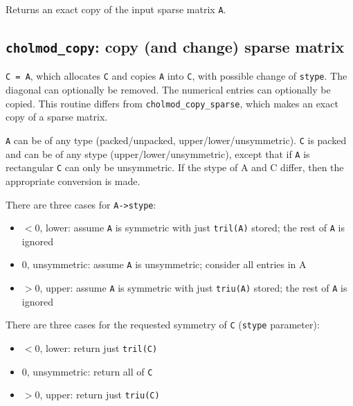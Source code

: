 \documentclass[11pt]{article}
\begin{document}

Returns an exact copy of the input sparse matrix {\tt A}.

\subsection{{\tt cholmod\_copy}: copy (and change) sparse matrix}


{\tt C = A}, which allocates {\tt C} and copies {\tt A} into {\tt C}, with possible change of
{\tt stype}.  The diagonal can optionally be removed.  The numerical entries
can optionally be copied.  This routine differs from {\tt cholmod\_copy\_sparse},
which makes an exact copy of a sparse matrix.

{\tt A} can be of any type (packed/unpacked, upper/lower/unsymmetric).  {\tt C} is
packed and can be of any stype (upper/lower/unsymmetric), except that if
{\tt A} is rectangular {\tt C} can only be unsymmetric.  If the stype of A and C
differ, then the appropriate conversion is made.

\noindent
There are three cases for {\tt A->stype}:
\begin{itemize}
\item $<0$,  lower: assume {\tt A} is symmetric with just {\tt tril(A)} stored; the rest of {\tt A} is ignored
\item $ 0$,  unsymmetric: assume {\tt A} is unsymmetric; consider all entries in A
\item $>0$,  upper: assume {\tt A} is symmetric with just {\tt triu(A)} stored; the rest of {\tt A} is ignored
\end{itemize}

\noindent
There are three cases for the requested symmetry of {\tt C} ({\tt stype} parameter):
\begin{itemize}
\item $<0$,  lower: return just {\tt tril(C)}
\item $0$,   unsymmetric: return all of {\tt C}
\item $>0$,  upper: return just {\tt triu(C)}
\end{itemize}
\end{document}
